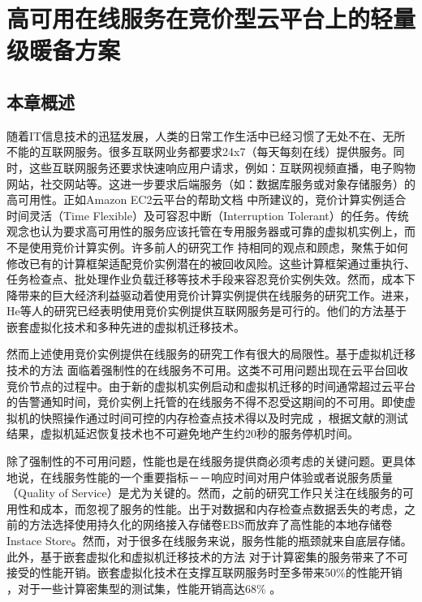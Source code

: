 \chapter{高可用在线服务在竞价型云平台上的轻量级暖备方案}
\label{cha:gemini}

\section{本章概述}
\label{sec:gemini_intro}
随着IT信息技术的迅猛发展，人类的日常工作生活中已经习惯了无处不在、无所不能的互联网服务。很多互联网业务都要求24x7（每天每刻在线）提供服务。同时，这些互联网服务还要求快速响应用户请求，例如：互联网视频直播，电子购物网站，社交网站等。这进一步要求后端服务（如：数据库服务或对象存储服务）的高可用性。正如Amazon EC2云平台的帮助文档 \cite{SI:2014} 中所建议的，竞价计算实例适合时间灵活（Time Flexible）及可容忍中断（Interruption Tolerant）的任务。传统观念也认为要求高可用性的服务应该托管在专用服务器或可靠的虚拟机实例上，而不是使用竞价计算实例。许多前人的研究工作 \cite{chohan2010see, Liu:2011:CMC:2170444.2170450, song2012optimal, Yi:2010:RCS:1844768.1845343, Andrzejak:2010:DMC:1906481.1906533} 持相同的观点和顾虑，聚焦于如何修改已有的计算框架适配竞价实例潜在的被回收风险。这些计算框架通过重执行、任务检查点、批处理作业负载迁移等技术手段来容忍竞价实例失效。然而，成本下降带来的巨大经济利益驱动着使用竞价计算实例提供在线服务的研究工作。进来，He等人的研究已经表明使用竞价实例提供互联网服务是可行的。他们的方法基于嵌套虚拟化技术和多种先进的虚拟机迁移技术。

然而上述使用竞价实例提供在线服务的研究工作有很大的局限性。基于虚拟机迁移技术的方法 \cite{He:2015:CCH:2749246.2749275} 面临着强制性的在线服务不可用。这类不可用问题出现在云平台回收竞价节点的过程中。由于新的虚拟机实例启动和虚拟机迁移的时间通常超过云平台的告警通知时间，竞价实例上托管的在线服务不得不忍受这期间的不可用。即使虚拟机的快照操作通过时间可控的内存检查点技术得以及时完成 \cite{Singh:2013:YEG:2482626.2482642}，根据文献\cite{Hines:2009:PBL:1508293.1508301}的测试结果，虚拟机延迟恢复技术也不可避免地产生约20秒的服务停机时间。

除了强制性的不可用问题，性能也是在线服务提供商必须考虑的关键问题。更具体地说，在线服务性能的一个重要指标－－响应时间对用户体验或者说服务质量（Quality of Service）是尤为关键的。然而，之前的研究工作只关注在线服务的可用性和成本，而忽视了服务的性能。出于对数据和内存检查点数据丢失的考虑，之前的方法选择使用持久化的网络接入存储卷EBS而放弃了高性能的本地存储卷Instace Store。然而，对于很多在线服务来说，服务性能的瓶颈就来自底层存储。此外，基于嵌套虚拟化和虚拟机迁移技术的方法 \cite{He:2015:CCH:2749246.2749275} 对于计算密集的服务带来了不可接受的性能开销。嵌套虚拟化技术在支撑互联网服务时至多带来50\%的性能开销 \cite{He:2015:CCH:2749246.2749275}，对于一些计算密集型的测试集，性能开销高达68\% \cite{Williams:2012:XVO:2168836.2168849}。

